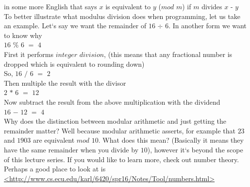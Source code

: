\documentclass[11]{article}
\begin{document}
in some more English that says $x$ is equivalent to $y$ ($mod$ $m$) if $m$ divides $x$ - $y$\\
To better illustrate what modulus division does when programming, let us take an example. Let`s say we want the remainder of $16$ $\div$ $6$. In another form we want to know why \\
$16$ $\%$ $6$ $=$ $4$\\
First it performs $integer$ $division$, (this means that any fractional number is dropped which is equivalent to rounding down)\\
So, $16$ $/$ $6$ $=$ $2$\\
Then multiple the result with the divisor\\
$2$ $*$ $6$ $=$ $12$\\
Now subtract the result from the above multiplication with the dividend\\
$16$ $-$ $12$ $=$ $4$\\

Why does the distinction between modular arithmetic and just getting the remainder matter? Well because modular arithmetic asserts, for example that $23$ and $1903$ are equivalent $mod$ $10$. What does this mean? (Basically it means they have the same remainder when you divide by $10$), however it`s beyond the scope of this lecture series. If you would like to learn more, check out number theory. Perhaps a good place to look at is \url{<http://www.cs.ecu.edu/karl/6420/spr16/Notes/Tool/numbers.html>}
\end{document}
